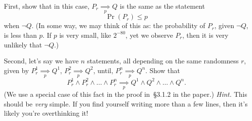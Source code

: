 \documentclass[12pt]{article}
\newcommand{\impliesn}[1]{\underset{#1}{\implies}}
\newcommand{\impliesp}{\impliesn{p}}
\begin{document}
First, show that in this case, $P_r \impliesp Q$ is the same as the statement
\[
    \Pr(P_r) \le p
\]
when $\neg Q$. (In some way, we may think of this as: the probability of $P_r$,
given $\neg Q$, is less than $p$. If $p$ is very small, like $2^{-80}$, yet we
observe $P_r$, then it is very unlikely that $\neg Q$.)

Second, let's say we have $n$ statements, all depending on the same randomness
$r$, given by $P_r^1 \impliesp Q^1$, $P_r^2 \impliesp Q^2$, until, $P_r^n
\impliesp Q^n$. Show that
\[
    P_r^1 \wedge P_r^2 \wedge \dots \wedge P_r^n \impliesp Q^1 \wedge Q^2 \wedge \dots \wedge Q^n.
\]
(We use a special case of this fact in the proof in~\S3.1.2 in the paper.)
\emph{Hint.} This should be \emph{very} simple. If you find yourself writing more
than a few lines, then it's likely you're overthinking it!
\end{document}
